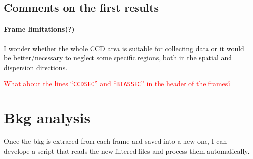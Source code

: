\documentclass{article}
\begin{document}
\subsection{Comments on the first results}

\paragraph{Frame limitations(?)} I wonder whether the whole CCD area is suitable for collecting data or it would be better/necessary to neglect some specific regions, both in the spatial and dispersion directions.

\textcolor{red}{What about the lines ``\texttt{CCDSEC}'' and ``\texttt{BIASSEC}'' in the header of the frames?}


\section{Bkg analysis}
Once the bkg is extraced from each frame and saved into a new one, I can develope a script that reads the new filtered files and process them automatically.
\end{document}
